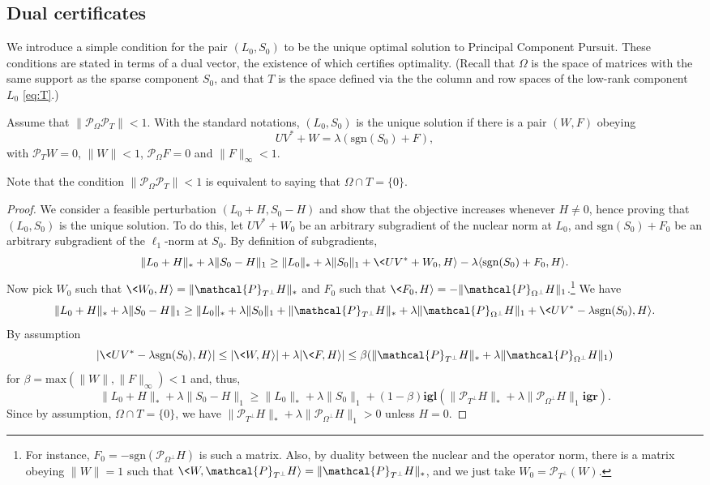 \subsection{Dual certificates}
\label{sec:kkt}

We introduce a simple condition for the pair $(L_0,S_0)$ to be the unique optimal solution to Principal Component Pursuit. These conditions are stated in terms of a dual vector, the existence of which certifies optimality. (Recall that $\Omega$ is the space of matrices with the same support as the sparse component $S_0$, and that $T$ is the space defined via the the column and row spaces of the low-rank component $L_0$ \eqref{eq:T}.)

\begin{lemma}
\label{teo:kkt}
Assume that $\|\mathcal{P}_{\Omega} \mathcal{P}_T\| < 1$. With the standard notations, $(L_0, S_0)$ is the unique solution if there is a pair $(W, F)$ obeying
\[
UV^* + W = \lambda(\textrm{sgn}(S_0) + F),  
\]
with $\mathcal{P}_T W = 0$, $\|W\| < 1$, $\mathcal{P}_{\Omega} F = 0$ and $\|F\|_\infty < 1$.
\end{lemma}

Note that the condition $\|\mathcal{P}_{\Omega} \mathcal{P}_T\| < 1$ is equivalent to saying that
$\Omega \cap T = \{0\}$.

\begin{proof}
  We consider a feasible perturbation $(L_0 + H, S_0 - H)$ and show that the objective increases whenever $H \neq 0$, hence proving that $(L_0,S_0)$ is the unique solution. To do this, let $UV^* + W_0$ be an arbitrary subgradient of the nuclear norm at $L_0$, and
  $\textrm{sgn}(S_0) + F_0$ be an arbitrary subgradient of the $\ell_1$-norm
  at $S_0$. By definition of subgradients,
\[
\|L_0 + H\|_* + \lambda \|S_0 - H\|_1 \ge \|L_0\|_* + \lambda
\|S_0\|_1 + \<UV^* + W_0, H\rangle - \lambda \langle\textrm{sgn}(S_0) + F_0, H\rangle.
\]
Now pick $W_0$ such that $\<W_0, H\rangle = \|\mathcal{P}_{T^\perp} H\|_*$ and $F_0$ such that $\<F_0, H\rangle = -\|\mathcal{P}_{\Omega^\perp} H\|_1$.\footnote{For instance, $F_0 = -
  \textrm{sgn}(\mathcal{P}_{\Omega^\perp} H)$ is such a matrix. Also, by duality between the nuclear and the operator norm, there is a matrix obeying $\|W\| = 1$ such that $\<W, \mathcal{P}_{T^\perp} H\rangle = \|\mathcal{P}_{T^\perp} H\|_*$, and we just take $W_0 =
  \mathcal{P}_{T^\perp}(W)$.}  We have
\[
\|L_0 + H\|_* + \lambda \|S_0 - H\|_1 \ge \|L_0\|_* + \lambda
\|S_0\|_1 + \|\mathcal{P}_{T^\perp} H\|_* + \lambda \|\mathcal{P}_{\Omega^\perp} H\|_1 + \<UV^*- \lambda
\textrm{sgn}(S_0), H\rangle.
\]
By assumption
\[
|\<UV^*- \lambda \textrm{sgn}(S_0), H\rangle| \le |\<W,H\rangle| + \lambda |\<F, H\rangle| \le \beta
(\|\mathcal{P}_{T^\perp} H\|_* + \lambda \|\mathcal{P}_{\Omega^\perp} H\|_1)
\]
for $\beta = \text{max}(\|W\|, \|F\|_\infty) < 1$ and, thus,
\[
\|L_0 + H\|_* + \lambda \|S_0 - H\|_1 \ge \|L_0\|_* + \lambda
\|S_0\|_1 + (1-\beta) \mathbf{igl}(\|\mathcal{P}_{T^\perp} H\|_* + \lambda \|\mathcal{P}_{\Omega^\perp} H\|_1\mathbf{igr}). 
\]
Since by assumption, $\Omega \cap T = \{0\}$, we have $\|\mathcal{P}_{T^\perp} H\|_* +
\lambda \|\mathcal{P}_{\Omega^\perp} H\|_1 > 0$ unless $H = 0$. 
\end{proof}

